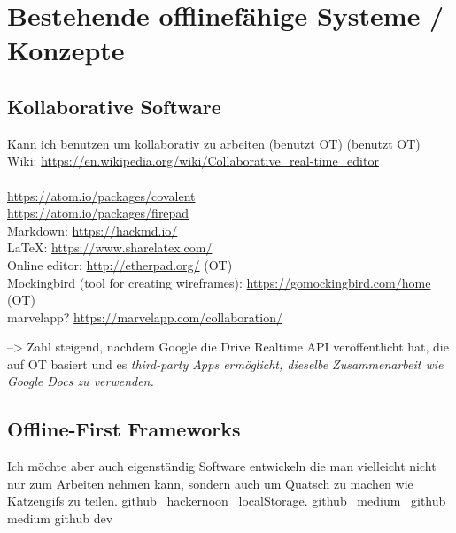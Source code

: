 \chapter{\label{chap:state}Bestehende offlinefähige Systeme / Konzepte}
\section{Kollaborative Software}
Kann ich benutzen um kollaborativ zu arbeiten
(benutzt OT)
(benutzt OT)
Wiki: \url{https://en.wikipedia.org/wiki/Collaborative_real-time_editor}\\\\
\url{https://atom.io/packages/covalent}\\
\url{https://atom.io/packages/firepad}\\
Markdown: \url{https://hackmd.io/}\\
LaTeX: \url{https://www.sharelatex.com/}\\
Online editor: \url{http://etherpad.org/} (OT)\\
Mockingbird (tool for creating wireframes): \url{https://gomockingbird.com/home} (OT)\\
marvelapp? \url{https://marvelapp.com/collaboration/}

--> Zahl steigend, nachdem Google die Drive Realtime API veröffentlicht hat, die auf \gls{OT} basiert und es \it{third-party Apps} ermöglicht, dieselbe Zusammenarbeit wie Google Docs zu verwenden.
\section{Offline-First Frameworks}
Ich möchte aber auch eigenständig Software entwickeln die man vielleicht nicht nur zum Arbeiten nehmen kann, sondern auch um Quatsch zu machen wie Katzengifs zu teilen.
%
%
\cite{realm}
%
%
github~\cite{redux-offline-gh}
hackernoon~\cite{redux-offline}
%
%
localStorage. github~\cite{redux-persist-gh} medium~\cite{redux-persist}
%
%
github \cite{rn-offline-gh} medium\cite{rn-offline-medium}
%
%
github\cite{webpack-gh}
dev\cite{webpack-dev}
%
%
\cite{hoodie}